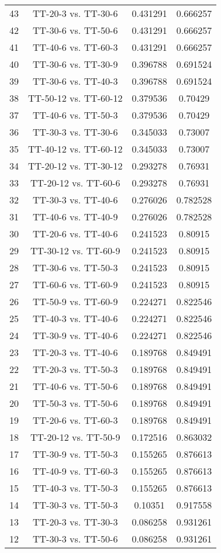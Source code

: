 \documentclass[a4paper,10pt]{article}
\begin{document}
\begin{landscape}
\begin{table}[!htp]
\begin{tabular}{cccc}
43&TT-20-3 vs. TT-30-6&0.431291&0.666257\\
42&TT-30-6 vs. TT-50-6&0.431291&0.666257\\
41&TT-40-6 vs. TT-60-3&0.431291&0.666257\\
40&TT-30-6 vs. TT-30-9&0.396788&0.691524\\
39&TT-30-6 vs. TT-40-3&0.396788&0.691524\\
38&TT-50-12 vs. TT-60-12&0.379536&0.70429\\
37&TT-40-6 vs. TT-50-3&0.379536&0.70429\\
36&TT-30-3 vs. TT-30-6&0.345033&0.73007\\
35&TT-40-12 vs. TT-60-12&0.345033&0.73007\\
34&TT-20-12 vs. TT-30-12&0.293278&0.76931\\
33&TT-20-12 vs. TT-60-6&0.293278&0.76931\\
32&TT-30-3 vs. TT-40-6&0.276026&0.782528\\
31&TT-40-6 vs. TT-40-9&0.276026&0.782528\\
30&TT-20-6 vs. TT-40-6&0.241523&0.80915\\
29&TT-30-12 vs. TT-60-9&0.241523&0.80915\\
28&TT-30-6 vs. TT-50-3&0.241523&0.80915\\
27&TT-60-6 vs. TT-60-9&0.241523&0.80915\\
26&TT-50-9 vs. TT-60-9&0.224271&0.822546\\
25&TT-40-3 vs. TT-40-6&0.224271&0.822546\\
24&TT-30-9 vs. TT-40-6&0.224271&0.822546\\
23&TT-20-3 vs. TT-40-6&0.189768&0.849491\\
22&TT-20-3 vs. TT-50-3&0.189768&0.849491\\
21&TT-40-6 vs. TT-50-6&0.189768&0.849491\\
20&TT-50-3 vs. TT-50-6&0.189768&0.849491\\
19&TT-20-6 vs. TT-60-3&0.189768&0.849491\\
18&TT-20-12 vs. TT-50-9&0.172516&0.863032\\
17&TT-30-9 vs. TT-50-3&0.155265&0.876613\\
16&TT-40-9 vs. TT-60-3&0.155265&0.876613\\
15&TT-40-3 vs. TT-50-3&0.155265&0.876613\\
14&TT-30-3 vs. TT-50-3&0.10351&0.917558\\
13&TT-20-3 vs. TT-30-3&0.086258&0.931261\\
12&TT-30-3 vs. TT-50-6&0.086258&0.931261\\

\end{tabular}
\end{table}
\end{landscape}
\end{document}
